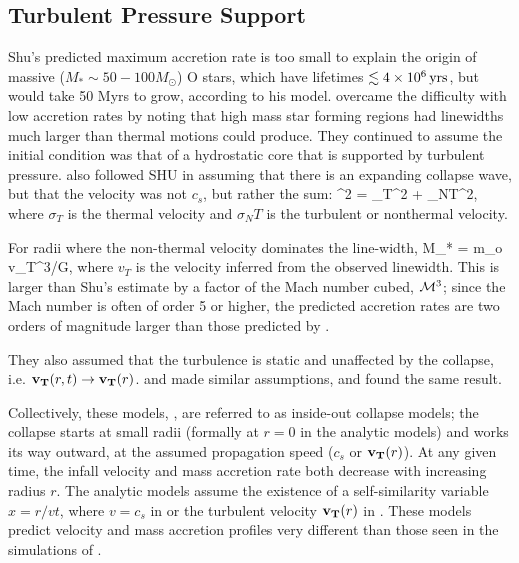 \documentclass[../dissertation.tex]{subfiles}
\begin{document}
\subsection{Turbulent Pressure Support}
Shu's predicted maximum  accretion rate is too small to explain the origin of massive ($M_*\sim50-100M_\odot$) O stars, which have lifetimes $\lesssim 4\times10^6\,\rm yrs$, but would take 50 Myrs to grow, according to his model.
\citet{1992ApJ...396..631M}  overcame the difficulty with low accretion rates by noting that high mass star forming regions had linewidths much larger than thermal motions could produce. 
They continued to assume the initial condition was that of a hydrostatic core that is supported by turbulent pressure. 
\citet{1992ApJ...396..631M} also followed SHU in assuming that there is an expanding collapse wave, but that the velocity was not $c_s$, but rather the sum: 
%
\be
\sigma^2 = \sigma_T^2 + \sigma_{NT}^2, 
\ee
%
where $\sigma_T$ is the thermal velocity and $\sigma_NT$ is the turbulent or nonthermal velocity. 

For radii where the non-thermal velocity dominates the line-width, 
%
\be
\dot M_* = m_o v_T^3/G,
\ee
%
where $v_T$ is the velocity inferred from the observed linewidth. 
This is larger than Shu's estimate by a factor of the Mach number cubed, ${\cal M}^3$; since the Mach number is often of order 5 or higher, the predicted accretion rates are two orders of magnitude larger than those predicted by \citet{1977ApJ...214..488S}.

They also assumed that the turbulence is static and unaffected by the collapse, i.e. $\mathbf{v_T} (r,t) \rightarrow \mathbf{v_T} (r)$.  
\citet{1997ApJ...476..750M} and \citet{2003ApJ...585..850M} made similar assumptions, and found the same result.  

Collectively, these models, \citep{1977ApJ...214..488S,1992ApJ...396..631M,1997ApJ...476..750M,2003ApJ...585..850M}, 
are referred to as inside-out collapse models; the collapse starts at small radii (formally at $r=0$ in the analytic models) 
and works its way outward, at the assumed propagation speed ($c_s$ or $\mathbf{v_T} (r)$). 
At any given time, the infall velocity and mass accretion rate both decrease with increasing radius $r$. 
The analytic models assume the existence of a self-similarity variable $x = r/vt$, where $v=c_s$ in 
\citet{1977ApJ...214..488S} or the turbulent velocity $\mathbf{v_T} (r)$ in \citet{1992ApJ...396..631M,1997ApJ...476..750M,2003ApJ...585..850M}.  
These models predict velocity and mass accretion profiles very different than those seen 
in the simulations of \citet{2015ApJ...800...49L}.
\end{document}
